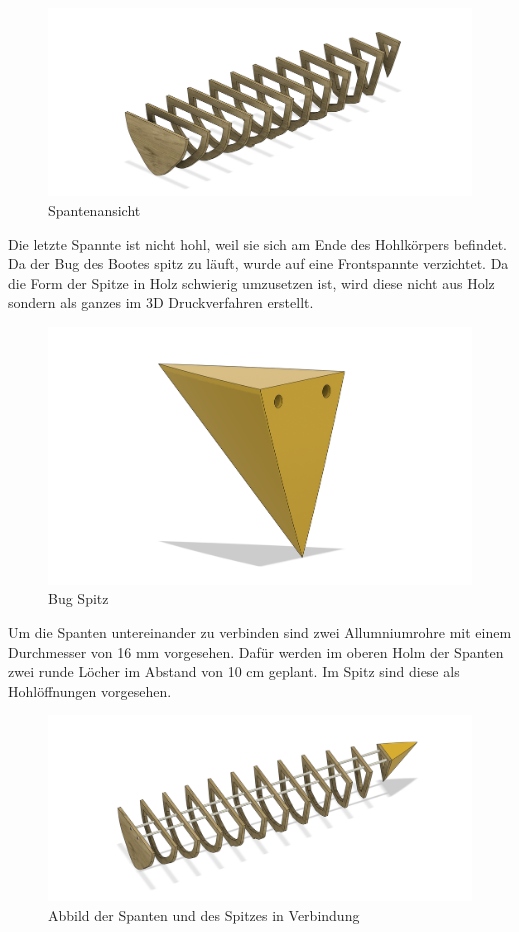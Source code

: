 \begin{figure}[H]
    \centering
    \includegraphics[width=1\linewidth]{assets/rippen_cad.png}
    \caption{Spantenansicht}
    
\end{figure}
Die letzte Spannte ist nicht hohl, weil sie sich am Ende des Hohlkörpers befindet.  \\
Da der Bug des Bootes spitz zu läuft, wurde auf eine Frontspannte verzichtet. Da die Form der Spitze in Holz schwierig umzusetzen ist, wird diese nicht aus Holz sondern als ganzes im 3D Druckverfahren erstellt.
\begin{figure}[H]
    \centering
    \includegraphics[width=0.8\linewidth]{assets/bug_spitz.png}
 \caption{Bug Spitz}
    
\end{figure}

Um die Spanten untereinander zu verbinden sind zwei Allumniumrohre mit einem Durchmesser von 16 mm vorgesehen. Dafür werden im oberen Holm der Spanten zwei runde Löcher im Abstand von 10 cm geplant. Im Spitz sind diese als Hohlöffnungen vorgesehen. 



\begin{figure}
    \centering
    \includegraphics[width=1\linewidth]{assets/full_skellet.png}
    \caption{Abbild der Spanten und des Spitzes in Verbindung}
    
\end{figure}

